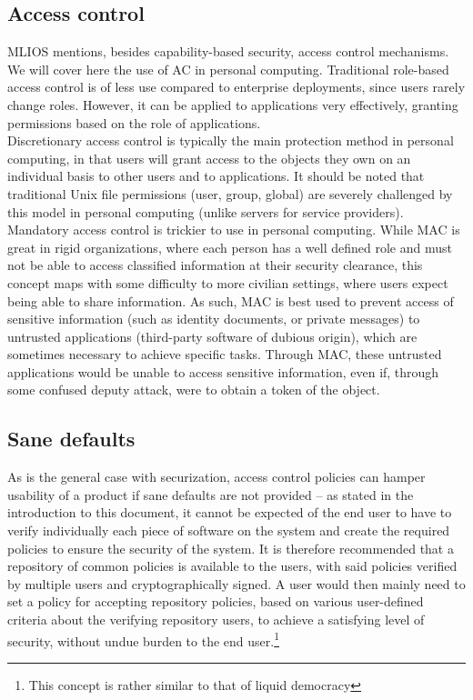 \documentclass[a4paper,utf8,11pt]{article}
\begin{document}
	\subsection{Access control}
	MLIOS mentions, besides capability-based security, access control mechanisms. We will cover here the use of AC in personal computing.
	Traditional role-based access control is of less use compared to enterprise deployments, since users rarely change roles. However, it can be applied to applications very effectively, granting permissions based on the role of applications.\\
	Discretionary access control is typically the main protection method in personal computing, in that users will grant access to the objects they own on an individual basis to other users and to applications. It should be noted that traditional Unix file permissions (user, group, global) are severely challenged by this model in personal computing (unlike servers for service providers).\\
	Mandatory access control is trickier to use in personal computing. While MAC is great in rigid organizations, where each person has a well defined role and must not be able to access classified information at their security clearance, this concept maps with some difficulty to more civilian settings, where users expect being able to share information. As such, MAC is best used to prevent access of sensitive information (such as identity documents, or private messages) to untrusted applications (third-party software of dubious origin), which are sometimes necessary to achieve specific tasks. Through MAC, these untrusted applications would be unable to access sensitive information, even if, through some confused deputy attack, were to obtain a token of the object.
	\subsection{Sane defaults}
	As is the general case with securization, access control policies can hamper usability of a product if sane defaults are not provided -- as stated in the introduction to this document, it cannot be expected of the end user to have to verify individually each piece of software on the system and create the required policies to ensure the security of the system. It is therefore recommended that a repository of common policies is available to the users, with said policies verified by multiple users and cryptographically signed. A user would then mainly need to set a policy for accepting repository policies, based on various user-defined criteria about the verifying repository users, to achieve a satisfying level of security, without undue burden to the end user.\footnote{This concept is rather similar to that of liquid democracy}
	\clearpage
\end{document}
